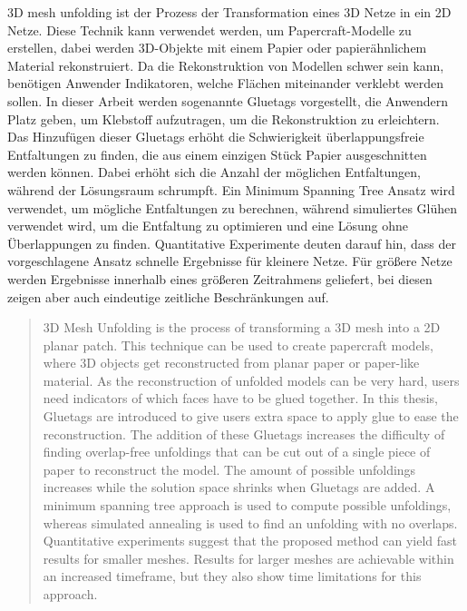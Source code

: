 \documentclass[draft,final]{vutinfth} %
\begin{document}
\begin{kurzfassung}
3D mesh unfolding ist der Prozess der Transformation eines 3D Netze in ein 2D Netze. Diese Technik kann verwendet werden, um Papercraft-Modelle zu erstellen, dabei werden 3D-Objekte mit einem Papier oder papierähnlichem Material rekonstruiert. Da die Rekonstruktion von Modellen schwer sein kann, benötigen Anwender Indikatoren, welche Flächen miteinander verklebt werden sollen. In dieser Arbeit werden sogenannte Gluetags vorgestellt, die Anwendern Platz geben, um Klebstoff aufzutragen, um die Rekonstruktion zu erleichtern. Das Hinzufügen dieser Gluetags erhöht die Schwierigkeit überlappungsfreie Entfaltungen zu finden, die aus einem einzigen Stück Papier ausgeschnitten werden können. Dabei erhöht sich die Anzahl der möglichen Entfaltungen, während der Lösungsraum schrumpft. Ein Minimum Spanning Tree Ansatz wird verwendet, um mögliche Entfaltungen zu berechnen, während simuliertes Glühen verwendet wird, um die Entfaltung zu optimieren und eine Lösung ohne Überlappungen zu finden. Quantitative Experimente deuten darauf hin, dass der vorgeschlagene Ansatz schnelle Ergebnisse für kleinere Netze. Für größere Netze werden Ergebnisse innerhalb eines größeren Zeitrahmens geliefert, bei diesen zeigen aber auch eindeutige zeitliche Beschränkungen auf.
\end{kurzfassung}

\begin{abstract}
3D Mesh Unfolding is the process of transforming a 3D mesh into a 2D planar patch. This technique can be used to create papercraft models, where 3D objects get reconstructed from planar paper or paper-like material. As the reconstruction of unfolded models can be very hard, users need indicators of which faces have to be glued together. In this thesis, Gluetags are introduced to give users extra space to apply glue to ease the reconstruction. The addition of these Gluetags increases the difficulty of finding overlap-free unfoldings that can be cut out of a single piece of paper to reconstruct the model. The amount of possible unfoldings increases while the solution space shrinks when Gluetags are added. A minimum spanning tree approach is used to compute possible unfoldings, whereas simulated annealing is used to find an unfolding with no overlaps. Quantitative experiments suggest that the proposed method can yield fast results for smaller meshes. Results for larger meshes are achievable within an increased timeframe, but they also show time limitations for this approach.
\end{abstract}
\end{document}
